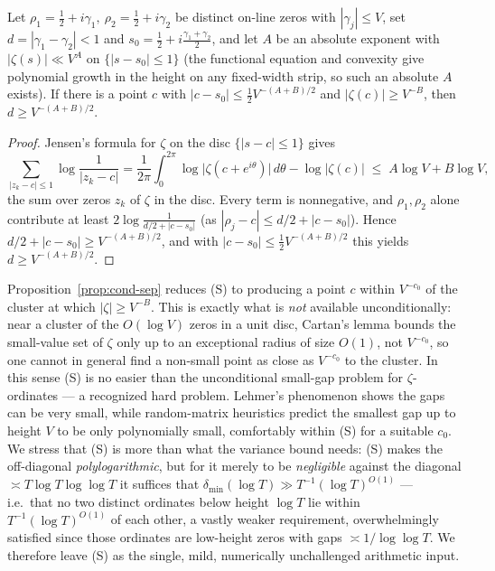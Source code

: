 \begin{proposition}\label{prop:cond-sep}
Let $\rho_1=\tfrac12+i\gamma_1,\ \rho_2=\tfrac12+i\gamma_2$ be distinct on-line
zeros with $|\gamma_j|\le V$, set $d=|\gamma_1-\gamma_2|<1$ and
$s_0=\tfrac12+i\tfrac{\gamma_1+\gamma_2}{2}$, and let $A$ be an absolute exponent
with $|\zeta(s)|\ll V^{A}$ on $\{|s-s_0|\le1\}$ \textup{(}the functional equation
and convexity give polynomial growth in the height on any fixed-width strip, so
such an absolute $A$ exists\textup{)}.
If there is a point $c$ with $|c-s_0|\le\tfrac12 V^{-(A+B)/2}$ and
$|\zeta(c)|\ge V^{-B}$, then $d\ge V^{-(A+B)/2}$.
\end{proposition}

\begin{proof}
Jensen's formula for $\zeta$ on the disc $\{|s-c|\le1\}$ gives
\[
\sum_{|z_k-c|\le1}\log\frac{1}{|z_k-c|}
=\frac{1}{2\pi}\!\int_0^{2\pi}\!\log\bigl|\zeta(c+e^{i\theta})\bigr|\,d\theta
-\log|\zeta(c)|
\;\le\; A\log V+B\log V,
\]
the sum over zeros $z_k$ of $\zeta$ in the disc.  Every term is nonnegative, and
$\rho_1,\rho_2$ alone contribute at least $2\log\frac{1}{d/2+|c-s_0|}$ (as
$|\rho_j-c|\le d/2+|c-s_0|$).  Hence $d/2+|c-s_0|\ge V^{-(A+B)/2}$, and with
$|c-s_0|\le\tfrac12 V^{-(A+B)/2}$ this yields $d\ge V^{-(A+B)/2}$.
\end{proof}

\begin{remark}\label{rmk:obstruction}
Proposition~\ref{prop:cond-sep} reduces (S) to producing a point $c$ within
$V^{-c_0}$ of the cluster at which $|\zeta|\ge V^{-B}$.  This is exactly what is
\emph{not} available unconditionally: near a cluster of the $O(\log V)$ zeros in
a unit disc, Cartan's lemma bounds the small-value set of $\zeta$ only up to an
exceptional radius of size $O(1)$, not $V^{-c_0}$, so one cannot in general find a
non-small point as close as $V^{-c_0}$ to the cluster.  In this sense (S) is no
easier than the unconditional small-gap problem for $\zeta$-ordinates --- a
recognized hard problem.  Lehmer's phenomenon shows the gaps can be very small,
while random-matrix heuristics predict the smallest gap up to height $V$ to be
only polynomially small, comfortably within (S) for a suitable $c_0$.
We stress that (S) is more than what the variance bound needs: (S) makes the
off-diagonal \emph{polylogarithmic}, but for it merely to be \emph{negligible}
against the diagonal $\asymp T\log T\log\log T$ it suffices that
$\delta_{\min}(\log T)\gg T^{-1}(\log T)^{O(1)}$ --- i.e.\ that no two distinct
ordinates below height $\log T$ lie within $T^{-1}(\log T)^{O(1)}$ of each other,
a vastly weaker requirement, overwhelmingly satisfied since those ordinates are
low-height zeros with gaps $\asymp 1/\log\log T$.  We therefore leave (S) as the
single, mild, numerically unchallenged arithmetic input.
\end{remark}


